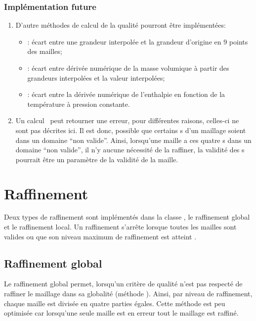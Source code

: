       
      \subsubsection{Implémentation future}
      \begin{enumerate}
       \item D'autre méthodes de calcul de la qualité pourront être implémentées:
       \vspace{0.3cm}
       \begin{itemize}
	 \item {}: écart entre une grandeur interpolée et la grandeur d’origine en 9 points des mailles;
	 \item {}: écart entre dérivée numérique de la masse volumique à partir des grandeurs interpolées et la valeur interpolées;
	 \item {}: écart entre la dérivée numérique de l’enthalpie en fonction de la température à pression constante.
       \end{itemize}
       \item Un calcul \EOS\ peut retourner une erreur, pour différentes raisons, celles-ci ne sont pas décrites ici.  
	Il est donc, possible que certains \n s d'un maillage soient dans un domaine ``non valide''.
	Ainsi, lorsqu'une maille a ces quatre \n s dans un domaine ``non valide'', il n'y aucune nécessité de la raffiner, 
	la validité des \n s pourrait être un paramètre de la validité de la maille.
      \end{enumerate}
	 
    \section{Raffinement}\label{raf}
    
    Deux types de raffinement sont implémentés dans la classe \IGEN, le raffinement global et le raffinement local. 
    Un raffinement s'arrête lorsque toutes les mailles sont valides 
    ou que son niveau maximum de raffinement est atteint .
    
    \subsection{Raffinement global}
    Le raffinement global permet, lorsqu'un critère de qualité n'est pas respecté de raffiner le maillage dans sa globalité (méthode ).
    Ainsi, par niveau de raffinement, chaque maille est divisée en quatre parties égales. 
    Cette méthode est peu optimisée car lorsqu'une seule maille est en erreur tout le maillage est raffiné.
    
